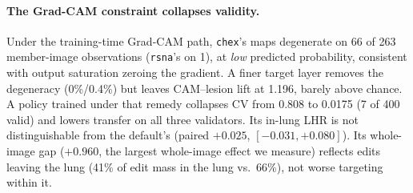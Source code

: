\paragraph{The Grad-CAM constraint collapses validity.} Under the training-time Grad-CAM path, \texttt{chex}'s maps degenerate on 66 of 263 member-image observations (\texttt{rsna}'s on 1), at \emph{low} predicted probability, consistent with output saturation zeroing the gradient. A finer target layer removes the degeneracy (0\%/0.4\%) but leaves CAM--lesion lift at 1.196, barely above chance. A policy trained under that remedy collapses CV from 0.808 to 0.0175 (7 of 400 valid) and lowers transfer on all three validators. Its in-lung LHR is not distinguishable from the default's (paired $+0.025$, $[-0.031, +0.080]$). Its whole-image gap ($+0.960$, the largest whole-image effect we measure) reflects edits leaving the lung (41\% of edit mass in the lung vs.\ 66\%), not worse targeting within it.

